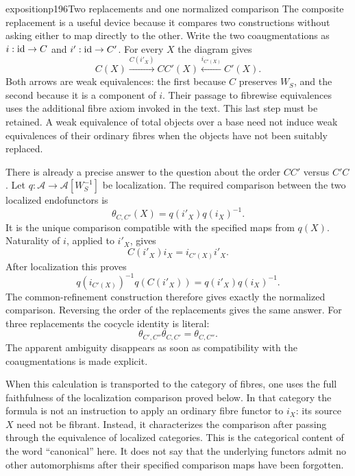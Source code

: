 \begin{dcomment}{exposition}{p196}{Two replacements and one normalized comparison}
The composite replacement is a useful device because it compares two constructions without asking either to map directly to the other. Write the two coaugmentations as $i:\mathrm{id}\to C$ and $i':\mathrm{id}\to C'$. For every $X$ the diagram gives
\[
 C(X)\xrightarrow{C(i'_X)}CC'(X)
       \xleftarrow{i_{C'(X)}}C'(X).
\]
Both arrows are weak equivalences: the first because $C$ preserves $W_S$, and the second because it is a component of $i$. Their passage to fibrewise equivalences uses the additional fibre axiom invoked in the text. This last step must be retained. A weak equivalence of total objects over a base need not induce weak equivalences of their ordinary fibres when the objects have not been suitably replaced.

There is already a precise answer to the question about the order $CC'$ versus $C'C$. Let $q:\mathcal A\to\mathcal A[W_S^{-1}]$ be localization. The required comparison between the two localized endofunctors is
\[
 \theta_{C,C'}(X)=q(i'_X)q(i_X)^{-1}.
\]
It is the unique comparison compatible with the specified maps from $q(X)$. Naturality of $i$, applied to $i'_X$, gives
\[
 C(i'_X)i_X=i_{C'(X)}i'_X.
\]
After localization this proves
\[
 q(i_{C'(X)})^{-1}q(C(i'_X))
       =q(i'_X)q(i_X)^{-1}.
\]
The common-refinement construction therefore gives exactly the normalized comparison. Reversing the order of the replacements gives the same answer. For three replacements the cocycle identity is literal:
\[
 \theta_{C',C''}\theta_{C,C'}=\theta_{C,C''}.
\]
The apparent ambiguity disappears as soon as compatibility with the coaugmentations is made explicit.

When this calculation is transported to the category of fibres, one uses the full faithfulness of the localization comparison proved below. In that category the formula is not an instruction to apply an ordinary fibre functor to $i_X$: its source $X$ need not be fibrant. Instead, it characterizes the comparison after passing through the equivalence of localized categories. This is the categorical content of the word ``canonical'' here. It does not say that the underlying functors admit no other automorphisms after their specified comparison maps have been forgotten.
\end{dcomment}



